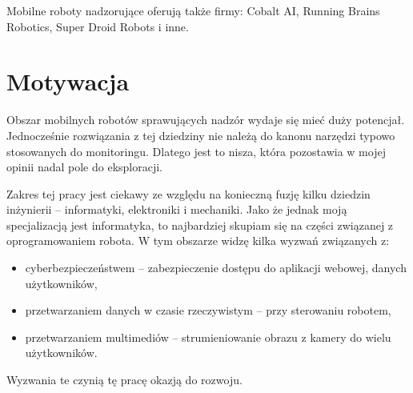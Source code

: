 Mobilne roboty nadzorujące oferują także firmy: Cobalt AI, Running Brains Robotics, Super Droid Robots i inne.

\section{Motywacja}
Obszar mobilnych robotów sprawujących nadzór wydaje się mieć duży potencjał.
Jednocześnie rozwiązania z tej dziedziny nie należą do kanonu narzędzi typowo stosowanych do monitoringu.
Dlatego jest to nisza, która pozostawia w mojej opinii nadal pole do eksploracji.

Zakres tej pracy jest ciekawy ze względu na konieczną fuzję kilku dziedzin inżynierii -- informatyki, elektroniki i mechaniki.
Jako że jednak moją specjalizacją jest informatyka, to najbardziej skupiam się na części związanej z oprogramowaniem robota.
W tym obszarze widzę kilka wyzwań związanych z:
\begin{itemize}
    \item cyberbezpieczeństwem -- zabezpieczenie dostępu do aplikacji webowej, danych użytkowników,
    \item przetwarzaniem danych w czasie rzeczywistym -- przy sterowaniu robotem,
    \item przetwarzaniem multimediów -- strumieniowanie obrazu z kamery do wielu użytkowników.
\end{itemize}
Wyzwania te czynią tę pracę okazją do rozwoju.